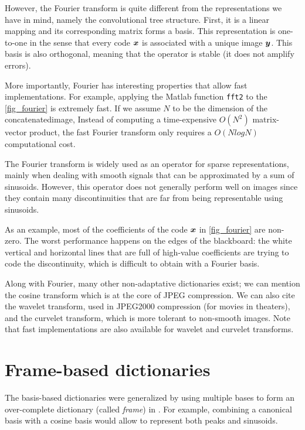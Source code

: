 However, the Fourier transform is quite different from the representations we have in mind, namely the convolutional tree structure. First, it is a linear mapping and its corresponding matrix forms a basis. This representation is one-to-one in the sense that every code $\bm{x}$ is associated with a unique image $\bm{y}$. This basis is also orthogonal, meaning that the operator is stable (it does not amplify errors). %

More importantly, Fourier has interesting properties that allow fast implementations. For example, applying the Matlab function \texttt{fft2} to the \cref{fig_fourier} is extremely fast. If we assume $N$ to be the dimension of the concatenated\footnotemark[1] image, Instead of computing a time-expensive $O(N^2)$ matrix-vector product, the fast Fourier transform only requires a $O(NlogN)$ computational cost.



The Fourier transform is widely used as an operator for sparse representations, mainly when dealing with smooth signals that can be approximated by a sum of sinusoids. However, this operator does not generally perform well on images since they contain many discontinuities that are far from being representable using sinusoids.

As an example, most of the coefficients of the code $\bm{x}$ in \cref{fig_fourier} are non-zero. The worst performance happens on the edges of the blackboard: the white vertical and horizontal lines that are full of high-value coefficients are trying to code the discontinuity, which is difficult to obtain with a Fourier basis.

Along with Fourier, many other non-adaptative dictionaries exist; we can mention the cosine transform which is at the core of JPEG compression. We can also cite the wavelet transform, used in JPEG2000 compression (for movies in theaters), and the curvelet transform, which is more tolerant to non-smooth images. Note that fast implementations are also available for wavelet and curvelet transforms.


\section{Frame-based dictionaries}

The basis-based dictionaries were generalized by using multiple bases to form an over-complete dictionary (called \emph{frame}) in \cite{chen_atomic_2001}. For example, combining a canonical basis with a cosine basis would allow to represent both peaks and sinusoids.

